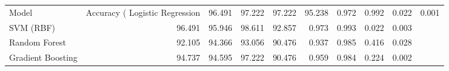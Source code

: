 \begin{tabular}{lrrrrrrrr}
\toprule
Model & Accuracy (%
\midrule
Logistic Regression & 96.491 & 97.222 & 97.222 & 95.238 & 0.972 & 0.992 & 0.022 & 0.001 \\
SVM (RBF) & 96.491 & 95.946 & 98.611 & 92.857 & 0.973 & 0.993 & 0.022 & 0.003 \\
Random Forest & 92.105 & 94.366 & 93.056 & 90.476 & 0.937 & 0.985 & 0.416 & 0.028 \\
Gradient Boosting & 94.737 & 94.595 & 97.222 & 90.476 & 0.959 & 0.984 & 0.224 & 0.002 \\
\bottomrule
\end{tabular}
